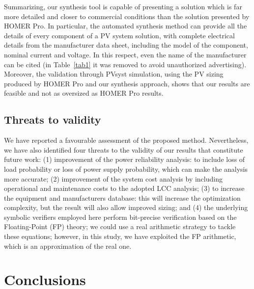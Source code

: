 \documentclass[runningheads]{llncs}
\begin{document}
Summarizing, our synthesis tool is capable of presenting a solution which is far more detailed and closer to commercial conditions than the solution presented by HOMER Pro. In particular, the automated synthesis method can provide all the details of every component of a PV system solution, with complete electrical details from the manufacturer data sheet, including  the model of the component, nominal current and voltage. In this respect, even the name of the manufacturer can be cited (in Table~\ref{tab1} it was removed to avoid unauthorized advertising). Moreover, the validation through PVsyst simulation, using the PV sizing produced by HOMER Pro and our synthesis approach, shows that our results are feasible and not as oversized as HOMER Pro results.

\subsection{Threats to validity} 

We have reported a favourable assessment of the proposed method. Nevertheless, we have also identified four threats to the validity of our results that constitute future work: (1) improvement of the power reliability analysis: to include loss of load probability or loss of power supply probability, which can make the analysis more accurate; (2) improvement of the system cost analysis by including operational and maintenance costs to the adopted LCC analysis; (3) to increase the equipment and manufacturers database: this will increase the optimization complexity, but the result will also allow improved sizing; and (4) the underlying symbolic verifiers employed here perform bit-precise verification based on the Floating-Point (FP) theory; we could use a real arithmetic strategy to tackle these equations; however, in this study, we have exploited the FP arithmetic, which is an approximation of the real one. 

\section{Conclusions} 
\end{document}
